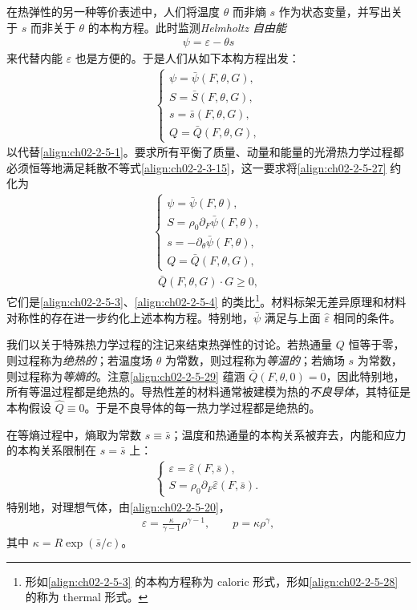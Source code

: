 \documentclass[../../main.tex]{subfiles}
\begin{document}
在热弹性的另一种等价表述中，人们将温度 $\theta$ 而非熵 $s$ 作为状态变量，并写出关于 $s$ 而非关于 $\theta$ 的本构方程。此时监测\emph{Helmholtz 自由能}
\begin{align}
\psi=\varepsilon-\theta s
\label{align:ch02-2-5-26}
\end{align}
来代替内能 $\varepsilon$ 也是方便的。于是人们从如下本构方程出发：
\begin{align}
\begin{cases}
\psi=\bar{\psi}(F,\theta,G),\\
S=\bar{S}(F,\theta,G),\\
s=\bar{s}(F,\theta,G),\\
Q=\bar{Q}(F,\theta,G),
\end{cases}
\label{align:ch02-2-5-27}
\end{align}
以代替\eqref{align:ch02-2-5-1}。要求所有平衡了质量、动量和能量的光滑热力学过程都必须恒等地满足耗散不等式\eqref{align:ch02-2-3-15}，这一要求将\eqref{align:ch02-2-5-27} 约化为
\begin{align}
\begin{cases}
\psi=\bar{\psi}(F,\theta),\\
S=\rho_{0}\partial_{F}\bar{\psi}(F,\theta),\\
s=-\partial_{\theta}\bar{\psi}(F,\theta),\\
Q=\bar{Q}(F,\theta,G),
\end{cases}
\label{align:ch02-2-5-28}
\end{align}
\begin{align}
\bar{Q}(F,\theta,G)\cdot G\geqslant 0,
\label{align:ch02-2-5-29}
\end{align}
它们是\eqref{align:ch02-2-5-3}、\eqref{align:ch02-2-5-4} 的类比\footnote{形如\eqref{align:ch02-2-5-3} 的本构方程称为 caloric 形式，形如\eqref{align:ch02-2-5-28} 的称为 thermal 形式。}。材料标架无差异原理和材料对称性的存在进一步约化上述本构方程。特别地，$\bar{\psi}$ 满足与上面 $\hat{\varepsilon}$ 相同的条件。

我们以关于特殊热力学过程的注记来结束热弹性的讨论。若热通量 $Q$ 恒等于零，则过程称为\emph{绝热的}；若温度场 $\theta$ 为常数，则过程称为\emph{等温的}；若熵场 $s$ 为常数，则过程称为\emph{等熵的}。注意\eqref{align:ch02-2-5-29} 蕴涵 $\bar{Q}(F,\theta,0)=0$，因此特别地，所有等温过程都是绝热的。导热性差的材料通常被建模为热的\emph{不良导体}，其特征是本构假设 $\hat{Q}\equiv 0$。于是不良导体的每一热力学过程都是绝热的。

在等熵过程中，熵取为常数 $s\equiv\bar{s}$；温度和热通量的本构关系被弃去，内能和应力的本构关系限制在 $s=\bar{s}$ 上：
\begin{align}
\begin{cases}
\varepsilon=\hat{\varepsilon}(F,\bar{s}),\\
S=\rho_{0}\partial_{F}\hat{\varepsilon}(F,\bar{s}).
\end{cases}
\label{align:ch02-2-5-30}
\end{align}
特别地，对理想气体，由\eqref{align:ch02-2-5-20}，
\begin{align}
\varepsilon=\frac{\kappa}{\gamma-1}\rho^{\gamma-1},\qquad p=\kappa\rho^{\gamma},
\label{align:ch02-2-5-31}
\end{align}
其中 $\kappa=R\exp(\bar{s}/c)$。
\end{document}
